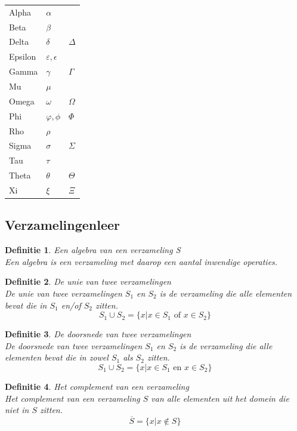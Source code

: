 \documentclass[a4paper]{article}
\newtheorem{tdefinitie}{Definitie}[section]
\newenvironment{definitie}[1]%
  {\begin{mdframed}[backgroundcolor=silver,
    topline=false,
    rightline=false,
    leftline=false,
    bottomline=false]\begin{tdefinitie}#1\\\normalfont}%
  {\end{tdefinitie}\end{mdframed}}
\newcommand{\en}{\ensuremath{\text{ en }}}
\newcommand{\of}{\ensuremath{\text{ of }}}
\begin{document}
\begin{tabular}{l|l|l}
	Alpha & $\alpha$ & \\
	Beta & $\beta$ & \\
	Delta & $\delta$ & $\Delta$ \\
	Epsilon & $\varepsilon, \epsilon$ & \\
	Gamma & $\gamma$ & $\Gamma$ \\
	Mu & $\mu$ & \\
	Omega & $\omega$ & $\Omega$ \\
	Phi & $\varphi, \phi$ & $\Phi$ \\
	Rho & $\rho$ & \\
	Sigma & $\sigma$ & $\Sigma$ \\
	Tau & $\tau$ & \\
	Theta & $\theta$ & $\Theta$ \\
	Xi & $\xi$ & $\Xi$ \\
\end{tabular}

\subsection{Verzamelingenleer}

\begin{definitie}{Een algebra van een verzameling S}
Een algebra is een verzameling met daarop een aantal inwendige operaties.
\end{definitie}

\begin{definitie}{De unie van twee verzamelingen}
  De unie van twee verzamelingen $S_1$ en $S_2$ is de verzameling die alle elementen bevat die in $S_1$ en/of $S_2$ zitten.
  \begin{equation*}
  S_1 \cup S_2 = \{x|x \in S_1 \of x \in S_2\}
  \end{equation*}
\end{definitie}

\begin{definitie}{De doorsnede van twee verzamelingen}
  De doorsnede van twee verzamelingen $S_1$ en $S_2$ is de verzameling die alle elementen bevat die in zowel $S_1$ als $S_2$ zitten.
  \begin{equation*}
  S_1 \cup S_2 = \{x|x \in S_1 \en x \in S_2\}
  \end{equation*}
\end{definitie}

\begin{definitie}{Het complement van een verzameling}
  Het complement van een verzameling $S$ van alle elementen uit het domein die niet in $S$ zitten.
  \begin{equation*}
  \overline{S} = \{x|x \notin S\}
  \end{equation*}
\end{definitie}
\end{document}
